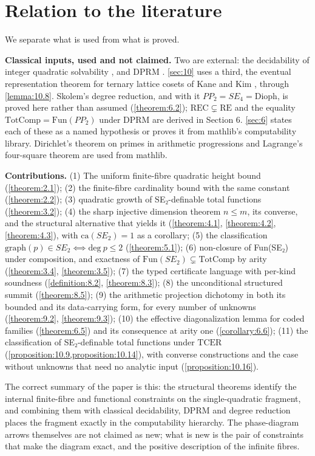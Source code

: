 \section{Relation to the literature}\label{sec:11}
We separate what is used from what is proved.

\textbf{Classical inputs, used and not claimed.} Two are external: the decidability of integer quadratic solvability \cite{GS04}, and DPRM \cite{DPR61,Mat70}. \cref{sec:10} uses a third, the eventual representation theorem for ternary lattice cosets of Kane and Kim \cite{KK26}, through \cref{lemma:10.8}. Skolem's degree reduction, and with it $PP_{2} = SE_{4} = \mathrm{Dioph}$, is proved here rather than assumed (\cref{theorem:6.2}); $\mathrm{REC} ⊊ \mathrm{RE}$ and the equality $\mathrm{TotComp} = \mathrm{Fun}(PP_{2})$ under DPRM are derived in Section 6. \cref{sec:6} states each of these as a named hypothesis or proves it from mathlib's computability library. Dirichlet's theorem on primes in arithmetic progressions and Lagrange's four-square theorem are used from mathlib.

\textbf{Contributions.} (1) The uniform finite-fibre quadratic height bound (\cref{theorem:2.1}); (2) the finite-fibre cardinality bound with the same constant (\cref{theorem:2.2}); (3) quadratic growth of SE₂-definable total functions (\cref{theorem:3.2}); (4) the sharp injective dimension theorem $n ≤ m$, its converse, and the structural alternative that yields it (\cref{theorem:4.1}, \cref{theorem:4.2}, \cref{theorem:4.3}), with $\mathrm{ca}(SE_{2}) = 1$ as a corollary; (5) the classification $\mathrm{graph}(p) ∈ SE_{2} ⟺ \mathrm{deg}\ p ≤ 2$ (\cref{theorem:5.1}); (6) non-closure of Fun(SE₂) under composition, and exactness of $\mathrm{Fun}(SE_{2}) ⊊ \mathrm{TotComp}$ by arity (\cref{theorem:3.4}, \cref{theorem:3.5}); (7) the typed certificate language with per-kind soundness (\cref{definition:8.2}, \cref{theorem:8.3}); (8) the unconditional structured summit (\cref{theorem:8.5}); (9) the arithmetic projection dichotomy in both its bounded and its data-carrying form, for every number of unknowns (\cref{theorem:9.2}, \cref{theorem:9.3}); (10) the effective diagonalization lemma for coded families (\cref{theorem:6.5}) and its consequence at arity one (\cref{corollary:6.6}); (11) the classification of SE₂-definable total functions under $\mathrm{TCER}$ (\cref{proposition:10.9,proposition:10.14}), with converse constructions and the case without unknowns that need no analytic input (\cref{proposition:10.16}).

The correct summary of the paper is this: the structural theorems identify the internal finite-fibre and functional constraints on the single-quadratic fragment, and combining them with classical decidability, DPRM and degree reduction places the fragment exactly in the computability hierarchy. The phase-diagram arrows themselves are not claimed as new; what is new is the pair of constraints that make the diagram exact, and the positive description of the infinite fibres.

